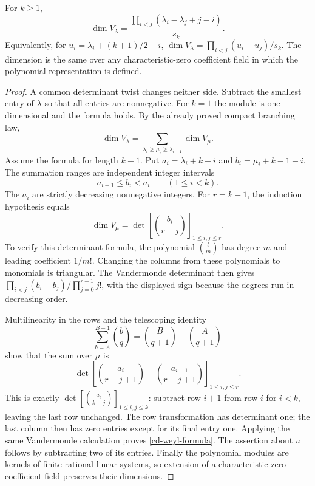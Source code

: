 \begin{proposition}\label{cd-weyl-dimension}
For $k\ge1$,
\begin{equation}\label{cd-weyl-formula}
        \dim V_\lambda
            =\frac{\prod_{i<j}(\lambda_i-\lambda_j+j-i)}{s_k}.
\end{equation}
Equivalently, for $u_i=\lambda_i+(k+1)/2-i$,
$\dim V_\lambda=\prod_{i<j}(u_i-u_j)/s_k$.
The dimension is the same over any characteristic-zero coefficient
field in which the polynomial representation is defined.
\end{proposition}
\begin{proof}
A common determinant twist changes neither side. Subtract the
smallest entry of $\lambda$ so that all entries are nonnegative.
For $k=1$ the module is one-dimensional and the formula holds.
By the already proved compact branching law,
\[
 \dim V_\lambda
    =\sum_{\lambda_i\ge\mu_i\ge\lambda_{i+1}}\dim V_\mu.
\]
Assume the formula for length $k-1$. Put
$a_i=\lambda_i+k-i$ and $b_i=\mu_i+k-1-i$.
The summation ranges are independent integer intervals
\[
                          a_{i+1}\le b_i<a_i
                                        \qquad(1\le i<k).
\]
The $a_i$ are strictly decreasing nonnegative integers.
For $r=k-1$, the induction hypothesis equals
\[
       \dim V_\mu
            =\det\left[\binom{b_i}{r-j}\right]_{1\le i,j\le r}.
\]
To verify this determinant formula, the polynomial
$\binom{t}{m}$ has degree $m$ and leading coefficient $1/m!$.
Changing the columns from these polynomials to monomials is
triangular. The Vandermonde determinant then gives
$\prod_{i<j}(b_i-b_j)/\prod_{j=0}^{r-1}j!$, with the displayed
sign because the degrees run in decreasing order.

Multilinearity in the rows and the telescoping identity
\[
 \sum_{b=A}^{B-1}\binom bq
                         =\binom B{q+1}-\binom A{q+1}
\]
show that the sum over $\mu$ is
\[
 \det\left[
      \binom{a_i}{r-j+1}-\binom{a_{i+1}}{r-j+1}
              \right]_{1\le i,j\le r}.
\]
This is exactly
$\det[\binom{a_i}{k-j}]_{1\le i,j\le k}$: subtract row
$i+1$ from row $i$ for $i<k$, leaving the last row unchanged.
The row transformation has determinant one; the last column
then has zero entries except for its final entry one.
Applying the same Vandermonde calculation proves
\eqref{cd-weyl-formula}. The assertion about $u$ follows by
subtracting two of its entries. Finally the polynomial modules
are kernels of finite rational linear systems, so extension of a
characteristic-zero coefficient field preserves their dimensions.
\end{proof}

